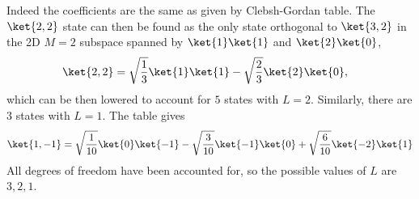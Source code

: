 \documentclass[12pt]{article}
\begin{document}
        Indeed the coefficients are the same as given by Clebsh-Gordan table. The \(\ket{2,2} \) state can then be found as the only state orthogonal to \(\ket{3,2} \) in the 2D \(M = 2\) subspace spanned by \(\ket{1} \ket{1} \) and \(\ket{2} \ket{0} \), \begin{align*}
            \ket{2,2} &= \sqrt{\frac{1}{3}} \ket{1} \ket{1} - \sqrt{\frac{2}{3}} \ket{2} \ket{0} , 
        \end{align*} which can be then lowered to account for \(5\) states with \(L = 2\). Similarly, there are 3 states with \(L = 1\). The table gives \[
            \ket{1, -1} = \sqrt{\frac{1}{10}} \ket{0} \ket{ -1} - \sqrt{\frac{3}{10}} \ket{ -1} \ket{0} + \sqrt{\frac{6}{10}} \ket{ -2} \ket{1}   
        \] All degrees of freedom have been accounted for, so the possible values of \(L\) are \(3,2,1\).
        
\end{document}
